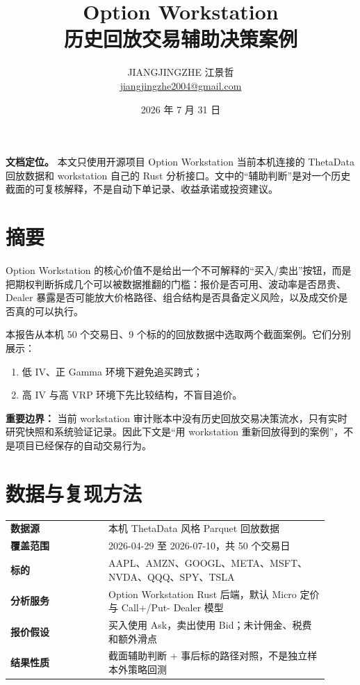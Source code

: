 \documentclass[UTF8,a4paper,11pt]{ctexart}
\title{\vspace{-1.1cm}\textcolor{ink}{Option Workstation\\历史回放交易辅助决策案例}}
\author{JIANGJINGZHE 江景哲\\\href{mailto:jiangjingzhe2004@gmail.com}{jiangjingzhe2004@gmail.com}}
\date{2026 年 7 月 31 日}
\begin{document}
\maketitle

\begin{center}
\colorbox{soft}{\parbox{0.94\linewidth}{\textbf{文档定位。} 本文只使用开源项目 Option Workstation 当前本机连接的 ThetaData 回放数据和 workstation 自己的 Rust 分析接口。文中的“辅助判断”是对一个历史截面的可复核解释，不是自动下单记录、收益承诺或投资建议。}}
\end{center}

\section{摘要}

Option Workstation 的核心价值不是给出一个不可解释的“买入/卖出”按钮，而是把期权判断拆成几个可以被数据推翻的门槛：报价是否可用、波动率是否昂贵、Dealer 暴露是否可能放大价格路径、组合结构是否具备定义风险，以及成交价是否真的可以执行。

本报告从本机 50 个交易日、9 个标的的回放数据中选取两个截面案例。它们分别展示：

\begin{enumerate}
  \item 低 IV、正 Gamma 环境下避免追买跨式；
  \item 高 IV 与高 VRP 环境下先比较结构，不盲目追价。
\end{enumerate}

\textbf{重要边界：} 当前 workstation 审计账本中没有历史回放交易决策流水，只有实时研究快照和系统验证记录。因此下文是“用 workstation 重新回放得到的案例”，不是项目已经保存的自动交易行为。

\section{数据与复现方法}

\begin{tabular}{>{\bfseries}p{0.28\linewidth}p{0.63\linewidth}}
\toprule
数据源 & 本机 ThetaData 风格 Parquet 回放数据\\
覆盖范围 & 2026-04-29 至 2026-07-10，共 50 个交易日\\
标的 & AAPL、AMZN、GOOGL、META、MSFT、NVDA、QQQ、SPY、TSLA\\
分析服务 & Option Workstation Rust 后端，默认 Micro 定价与 Call+/Put- Dealer 模型\\
报价假设 & 买入使用 Ask，卖出使用 Bid；未计佣金、税费和额外滑点\\
结果性质 & 截面辅助判断 + 事后标的路径对照，不是独立样本外策略回测\\
\bottomrule
\end{tabular}
\end{document}

